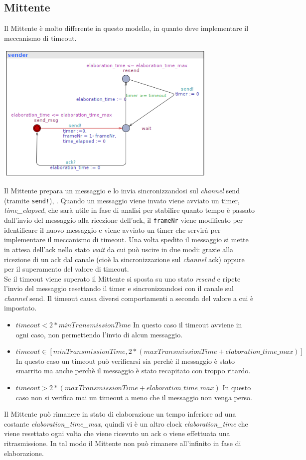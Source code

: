 \documentclass[a4paper]{article}
\newcommand{\channel}{\textit{channel }}
\begin{document}
\subsection{Mittente}
Il Mittente è molto differente in questo modello, in quanto deve implementare il meccanismo di timeout.
\begin{center}\includegraphics[width=0.8\textwidth]{2_sender.png}\end{center}
Il Mittente prepara un messaggio e lo invia sincronizzandosi sul \channel send (tramite \texttt{send!}), .
Quando un messaggio viene invato viene avviato un timer, \textit{time\_elapsed}, che sarà utile in fase di analisi per stabilire quanto tempo è passato dall'invio del messaggio alla ricezione dell'ack, il \texttt{frameNr} viene modificato per identificare il nuovo messaggio e viene avviato un timer che servirà per implementare il meccanismo di timeout.
Una volta spedito il messaggio si mette in attesa dell'ack nello stato \textit{wait} da cui può uscire in due modi: grazie alla ricezione di un ack dal canale (cioè la sincronizzazione sul \channel ack) oppure per il superamento del valore di timeout.\\
Se il timeout viene superato il Mittente si sposta su uno stato \textit{resend} e ripete l'invio del messaggio resettando il timer e sincronizzandosi con il canale sul \channel send.
Il timeout causa diversi comportamenti a seconda del valore a cui è impostato.
\begin{itemize}
	\item $timeout < 2 * minTransmissionTime$ In questo caso il timeout avviene in ogni caso, non permettendo l'invio di alcun messaggio.
	\item $timeout \in [minTransmissionTime, 2 * (maxTransmissionTime + elaboration\_time\_max)]$ In questo caso un timeout può verificarsi sia perchè il messaggio è stato smarrito ma anche perchè il messaggio è stato recapitato con troppo ritardo.
	\item $timeout > 2 * (maxTransmissionTime + elaboration\_time\_max)$ In questo caso non si verifica mai un timeout a meno che il messaggio non venga perso.
\end{itemize}
Il Mittente può rimanere in stato di elaborazione un tempo inferiore ad una costante \textit{elaboration\_time\_max}, quindi vi è un altro clock \textit{elaboration\_time} che viene resettato ogni volta che viene ricevuto un ack o viene effettuata una ritrasmissione.
In tal modo il Mittente non può rimanere all'infinito in fase di elaborazione.
\end{document}
